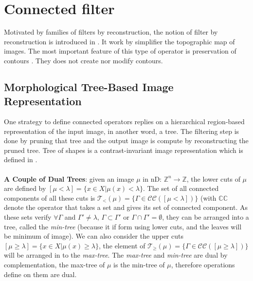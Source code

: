 \documentclass[12pt,a4paper]{report}
\begin{document}
\section{Connected filter}
Motivated by families of filters by reconstruction, the notion of filter by reconstruction is introduced in \cite{Salembier95flatzones} \cite{Serra1993}. It work by simplifier the topographic map of images. The most important feature of this type of operator is preservation of contours \cite{Salembier2009}. They does not create nor modify contours.
\subsection{Morphological Tree-Based Image Representation}
One strategy to define connected operators replies on a hierarchical region-based representation of the input image, in another word, a tree. The filtering step is done by pruning that tree and the output image is compute by reconstructing the pruned tree. Tree of shapes is a contrast-invariant image representation which is defined in \cite{Monasse.2000}.
\paragraph{} \textbf{A Couple of Dual Trees}: given an image $\mu $ in nD: $\mathbb{Z}^{n} \rightarrow \mathbb{Z} $, the lower cuts of $\mu$ are defined by 
	$[\mu < \lambda] =\lbrace x \in X \vert \mu (x) < \lambda \rbrace $. The set of all connected components of all these cuts is $ \mathcal{T}_< (\mu) =\lbrace \Gamma \in \mathcal{C}\mathcal{C}([\mu < \lambda]) \rbrace $ (with $\mathbb{C}\mathbb{C}$ denote the operator that takes a set and gives its set of connected component. As these sets verify $\forall \Gamma$ and $\Gamma ' \neq \lambda$, $\Gamma \subset \Gamma ' $ or $\Gamma \cap \Gamma '= \emptyset$, they can be arranged into a tree, called the \textit{min-tree} (because it if form using lower cuts, and the leaves will be minimum of image). We can also consider the upper cuts $[\mu \geq \lambda] =\lbrace x \in X \vert \mu (x) \geq \lambda \rbrace $, the element of $ \mathcal{T}_\geq (\mu) =\lbrace \Gamma \in \mathcal{C}\mathcal{C}([\mu \geq \lambda]) \rbrace $ will be arranged in to the \textit{max-tree}. The \textit{max-tree} and \textit{min-tree} are dual by complementation, the max-tree of $\mu$ is the min-tree of $ \mu$, therefore operations define on them are dual.
\end{document}

